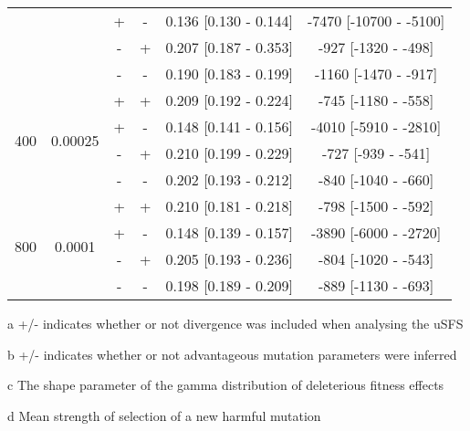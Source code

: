 \begin{table}
\begin{threeparttable}[b]
\begin{tabular}{cccccc}
    &&     + &        - &  0.136 [0.130 - 0.144] & -7470 [-10700 -  -5100] \\
      &&   - &        + &  0.207 [0.187 - 0.353] &  -927 [-1320 -  -498] \\
        && - &        - &  0.190 [0.183 - 0.199] & -1160 [-1470 -  -917] \\ \hline
 \multirow{4}{*}{400}&\multirow{4}{*}{0.00025}&         + &        + &  0.209 [0.192 - 0.224] &  -745 [-1180 -  -558] \\
  &&       + &        - &  0.148 [0.141 - 0.156] & -4010 [-5910 -  -2810] \\
    &&     - &        + &  0.210 [0.199 - 0.229] &  -727 [-939 -  -541] \\
      &&   - &        - &  0.202 [0.193 - 0.212] &  -840 [-1040 -  -660] \\ \hline
         \multirow{4}{*}{800}&\multirow{4}{*}{0.0001}&  + &        + &  0.210 [0.181 - 0.218] &  -798 [-1500 -  -592] \\
&&         + &        - &  0.148 [0.139 - 0.157] & -3890 [-6000 -  -2720] \\
  &&       - &        + &  0.205 [0.193 - 0.236] &  -804 [-1020 -  -543] \\
    &&     - &        - &  0.198 [0.189 - 0.209] &  -889 [-1130 -  -693] \\
\bottomrule
\end{tabular}

   \begin{tablenotes}
     \item[a] +/- indicates whether or not divergence was included when analysing the uSFS
     \item[b] +/- indicates whether or not advantageous mutation parameters were inferred
     \item[c] The shape parameter of the gamma distribution of deleterious fitness effects
     \item[d] Mean strength of selection of a new harmful mutation
   \end{tablenotes}
  \end{threeparttable}
  
\end{table}

